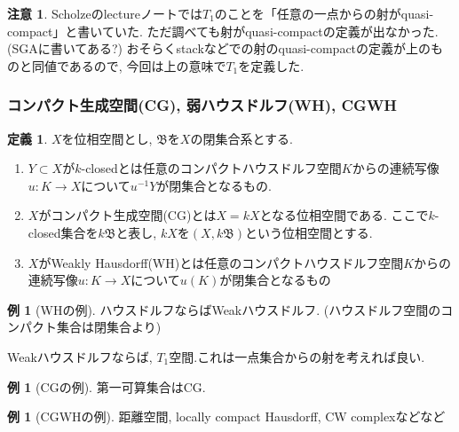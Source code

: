 \documentclass[dvipdfmx,a4paper,11pt]{article}
\theoremstyle{definition}
\newtheorem{dfn}[thm]{定義}
\newtheorem{rem}[thm]{注意}
\newtheorem{exa}[thm]{例}
\begin{document}
 \begin{rem}
 Scholzeのlectureノート\cite{Sch19}では$T_1$のことを「任意の一点からの射がquasi-compact」と書いていた.
 ただ調べても射がquasi-compactの定義が出なかった. (SGAに書いてある?)
 おそらくstackなどでの射のquasi-compactの定義が上のものと同値であるので, 今回は上の意味で$T_1$を定義した. 
 
 \end{rem}

\subsubsection{コンパクト生成空間(CG), 弱ハウスドルフ(WH), CGWH}


\begin{tcolorbox}
 [colback = white, colframe = green!35!black, fonttitle = \bfseries,breakable = true]
\begin{dfn}\cite[Definition 1.1 ,1.2]{Str}
$X$を位相空間とし, $\mathfrak{B}$を$X$の閉集合系とする. 
\begin{enumerate}
\item $Y \subset X$が$k$-closedとは任意のコンパクトハウスドルフ空間$K$からの連続写像$u : K \to X$について$u^{-1}Y$が閉集合となるもの. 
\item $X$がコンパクト生成空間(CG)とは$X = kX$となる位相空間である. ここで$k$-closed集合を$k\mathfrak{B}$と表し, $kX$を$(X, k\mathfrak{B})$という位相空間とする. 
\item $X$がWeakly Hausdorff(WH)とは任意のコンパクトハウスドルフ空間$K$からの連続写像$u : K \to X$について$u(K)$が閉集合となるもの
\end{enumerate}
\end{dfn}
\end{tcolorbox}

\begin{exa}[WHの例]
ハウスドルフならばWeakハウスドルフ. (ハウスドルフ空間のコンパクト集合は閉集合より)

Weakハウスドルフならば, $T_1$空間.これは一点集合からの射を考えれば良い.
\end{exa}

\begin{exa}[CGの例]
第一可算集合はCG. 
\end{exa}

\begin{exa}[CGWHの例]
距離空間, locally compact Hausdorff, CW complexなどなど
\end{exa}
\end{document}
